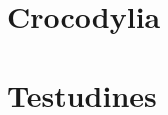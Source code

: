 \documentclass{article}
\begin{document}
\tableofcontents
\pagebreak
\section{Crocodylia}

\pagebreak

\pagebreak
\section{Testudines}

\pagebreak

\pagebreak


\end{document}
